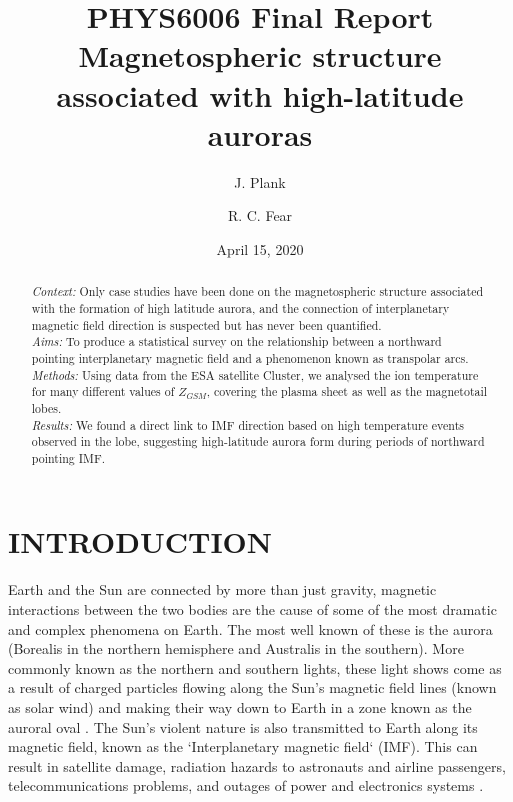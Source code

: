 \documentclass{article}
\title{PHYS6006 Final Report \\
       Magnetospheric structure associated with high-latitude auroras}
\author[1]{J. Plank}
\author[2]{R. C. Fear}
\affil[1, 2]{Department of Physics and Astronomy, University of Southampton}
\date{April 15, 2020}
\begin{document}
\maketitle

\begin{abstract}
    \noindent\textit{Context:} Only case studies have been done on the magnetospheric structure associated with the formation of high latitude aurora, and the connection of interplanetary magnetic field direction is suspected but has never been quantified.\\
    \textit{Aims:} To produce a statistical survey on the relationship between a northward pointing interplanetary magnetic field and a phenomenon known as transpolar arcs.\\
    \textit{Methods:} Using data from the ESA satellite Cluster, we analysed the ion temperature for many different values of $Z_{GSM}$, covering the plasma sheet as well as the magnetotail lobes.\\
    \textit{Results:} We found a direct link to IMF direction based on high temperature events observed in the lobe, suggesting high-latitude aurora form during periods of northward pointing IMF.
\end{abstract}

\pagebreak

\tableofcontents
{}
\bigskip
\listoffigures

\pagebreak


\section{INTRODUCTION}
Earth and the Sun are connected by more than just gravity, magnetic interactions between the two bodies are the cause of some of the most dramatic and complex phenomena on Earth. The most well known of these is the aurora (Borealis in the northern hemisphere and Australis in the southern). More commonly known as the northern and southern lights, these light shows come as a result of charged particles flowing along the Sun's magnetic field lines (known as solar wind) and making their way down to Earth in a zone known as the auroral oval \cite{AAAspaceweather}. The Sun's violent nature is also transmitted to Earth along its magnetic field, known as the `Interplanetary magnetic field` (IMF). This can result in satellite damage, radiation hazards to astronauts and airline passengers, telecommunications problems, and outages of power and electronics systems \cite{AAAspaceweather}.
\end{document}
